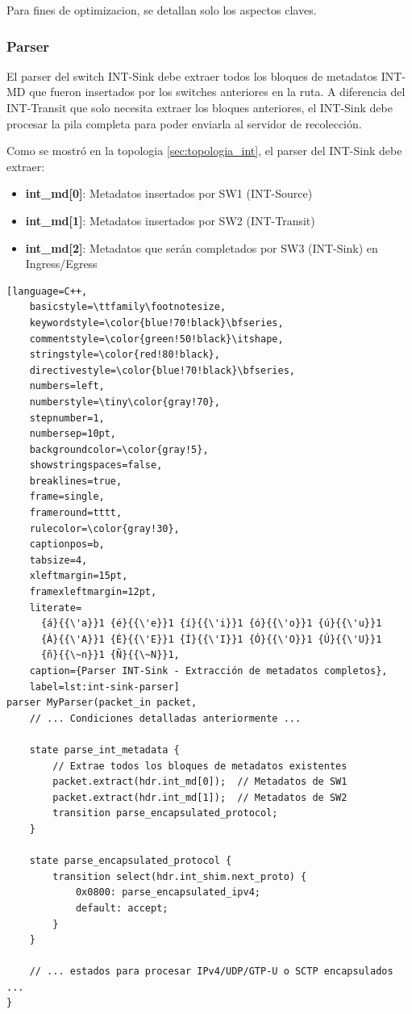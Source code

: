 Para fines de optimizacion, se detallan solo los aspectos claves.

\subsubsection{Parser}
El parser del switch INT-Sink debe extraer todos los bloques de metadatos INT-MD que fueron insertados por los switches anteriores en la ruta. A diferencia del INT-Transit que solo necesita extraer los bloques anteriores, el INT-Sink debe procesar la pila completa para poder enviarla al servidor de recolección.

Como se mostró en la topologia \ref{sec:topologia_int}, el parser del INT-Sink debe extraer:
\begin{itemize}
    \item \textbf{int\_md[0]}: Metadatos insertados por SW1 (INT-Source)
    \item \textbf{int\_md[1]}: Metadatos insertados por SW2 (INT-Transit)
    \item \textbf{int\_md[2]}: Metadatos que serán completados por SW3 (INT-Sink) en Ingress/Egress
\end{itemize}

\begin{lstlisting}[language=C++,
    basicstyle=\ttfamily\footnotesize,
    keywordstyle=\color{blue!70!black}\bfseries,
    commentstyle=\color{green!50!black}\itshape,
    stringstyle=\color{red!80!black},
    directivestyle=\color{blue!70!black}\bfseries,
    numbers=left,
    numberstyle=\tiny\color{gray!70},
    stepnumber=1,
    numbersep=10pt,
    backgroundcolor=\color{gray!5},
    showstringspaces=false,
    breaklines=true,
    frame=single,
    frameround=tttt,
    rulecolor=\color{gray!30},
    captionpos=b,
    tabsize=4,
    xleftmargin=15pt,
    framexleftmargin=12pt,
    literate=
      {á}{{\'a}}1 {é}{{\'e}}1 {í}{{\'i}}1 {ó}{{\'o}}1 {ú}{{\'u}}1
      {Á}{{\'A}}1 {É}{{\'E}}1 {Í}{{\'I}}1 {Ó}{{\'O}}1 {Ú}{{\'U}}1
      {ñ}{{\~n}}1 {Ñ}{{\~N}}1,
    caption={Parser INT-Sink - Extracción de metadatos completos}, 
    label=lst:int-sink-parser]
parser MyParser(packet_in packet,
    // ... Condiciones detalladas anteriormente ...

    state parse_int_metadata {
        // Extrae todos los bloques de metadatos existentes
        packet.extract(hdr.int_md[0]);  // Metadatos de SW1
        packet.extract(hdr.int_md[1]);  // Metadatos de SW2
        transition parse_encapsulated_protocol;
    }

    state parse_encapsulated_protocol {
        transition select(hdr.int_shim.next_proto) {
            0x0800: parse_encapsulated_ipv4;
            default: accept;
        }
    }

    // ... estados para procesar IPv4/UDP/GTP-U o SCTP encapsulados ...
}
\end{lstlisting}

